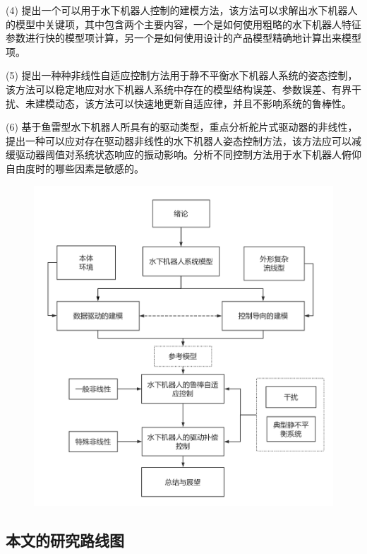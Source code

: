 (4) 提出一个可以用于水下机器人控制的建模方法，该方法可以求解出水下机器人的模型中关键项，其中包含两个主要内容，一个是如何使用粗略的水下机器人特征参数进行快的模型项计算，另一个是如何使用设计的产品模型精确地计算出来模型项。

(5) 提出一种种非线性自适应控制方法用于静不平衡水下机器人系统的姿态控制，该方法可以稳定地应对水下机器人系统中存在的模型结构误差、参数误差、有界干扰、未建模动态，该方法可以快速地更新自适应律，并且不影响系统的鲁棒性。

(6) 基于鱼雷型水下机器人所具有的驱动类型，重点分析舵片式驱动器的非线性，提出一种可以应对存在驱动器非线性的水下机器人姿态控制方法，该方法应可以减缓驱动器阈值对系统状态响应的振动影响。分析不同控制方法用于水下机器人俯仰自由度时的哪些因素是敏感的。

\begin{figure}
\centering
\includegraphics[width=14cm]{figure/chap1/diagram_2.png}
\label{fig:chap1:F4}
\end{figure}


\subsection{本文的研究路线图 }

